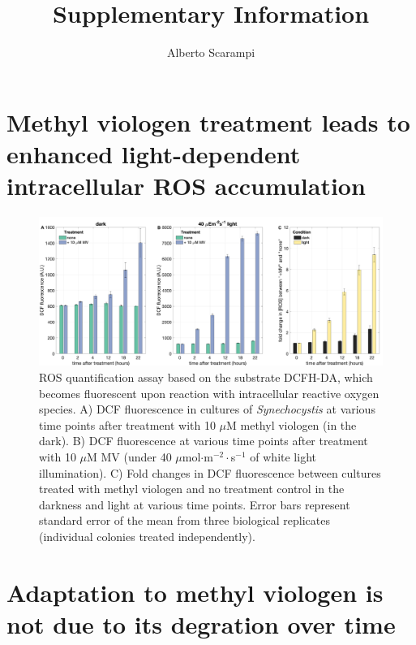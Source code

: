 \documentclass[12pt]{article}
\title{\textbf{Supplementary Information} 
}
\author{Alberto Scarampi}
\date{}
\begin{document}
\maketitle

\tableofcontents



\section{Methyl viologen treatment leads to enhanced light-dependent intracellular ROS accumulation}


\begin{figure}[H]
    \centering
    \includegraphics[width=\hsize]{../Figures/MV_adaptation/MV_ROS_DFCDA_Syn6803.png}
    \caption{ROS quantification assay based on the substrate DCFH-DA, which becomes fluorescent upon reaction with intracellular reactive oxygen species. A) DCF fluorescence in cultures of \textit{Synechocystis} at various time points after treatment with 10 $\mu$M methyl viologen (in the dark). B) DCF fluorescence at various time points after treatment with 10 $\mu$M MV (under 40 $\mu$mol$\cdot$m$^{-2}\cdot$s$^{-1}$ of white light illumination). C) Fold changes in DCF fluorescence between cultures treated with methyl viologen and no treatment control in the darkness and light at various time points. Error bars represent standard error of the mean from three biological replicates (individual colonies treated independently).}
    \label{fig:spectraMV1}
\end{figure}

\section{Adaptation to methyl viologen is not due to its degration over time}
\end{document}
